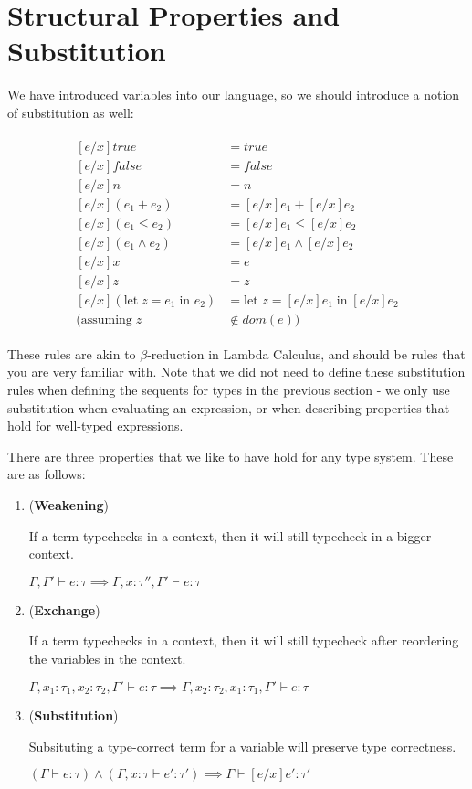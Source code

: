 \documentclass{article}
\newcommand{\inlineeq}[1]{
    \vspace{-2em}
    \begin{gather*}
    #1
    \end{gather*}
    \vspace{-2em}
}
\begin{document}
\newpage
\section{Structural Properties and Substitution}

We have introduced variables into our language, so we should introduce a notion of substitution as well:

\inlineeq{
\begin{split}
[e/x]true &= true \\
[e/x]false &= false \\
[e/x]n &= n \\
[e/x](e_1 + e_2) &= [e/x]e_1 + [e/x]e_2 \\
[e/x](e_1 \leq e_2) &= [e/x]e_1 \leq [e/x]e_2 \\
[e/x](e_1 \land e_2) &= [e/x]e_1 \land [e/x]e_2 \\
[e/x]x &= e \\
[e/x]z &= z \\
[e/x](\textrm{let} \; z = e_1 \; \textrm{in }e_2) &= \textrm{let }z = [e/x]e_1 \; \textrm{in} \; [e/x]e_2 \\
(\textrm{assuming} \; z &\notin dom(e))
\end{split}
}

These rules are akin to $\beta$-reduction in Lambda Calculus, and should be rules that you are very familiar with. Note that we did not need to define these substitution rules when defining the sequents for types in the previous section - we only use substitution when evaluating an expression, or when describing properties that hold for well-typed expressions.

There are three properties that we like to have hold for any type system. These are as follows:

\begin{enumerate}
\item (\textbf{Weakening})

If a term typechecks in a context, then it will still typecheck in a bigger context.

$\Gamma, \Gamma' \vdash e : \tau \implies \Gamma, x : \tau'', \Gamma' \vdash e : \tau$

\item (\textbf{Exchange})

If a term typechecks in a context, then it will still typecheck after reordering the variables in the context.

$\Gamma, x_1 : \tau_1, x_2 : \tau_2, \Gamma' \vdash e : \tau \implies
\Gamma, x_2 : \tau_2, x_1 : \tau_1, \Gamma' \vdash e : \tau$

\item (\textbf{Substitution})

Subsituting a type-correct term for a variable will preserve type correctness.

$(\Gamma \vdash e : \tau) \land (\Gamma, x : \tau \vdash e' : \tau') \implies
\Gamma \vdash [e/x]e' : \tau'$
\end{enumerate}
\end{document}
